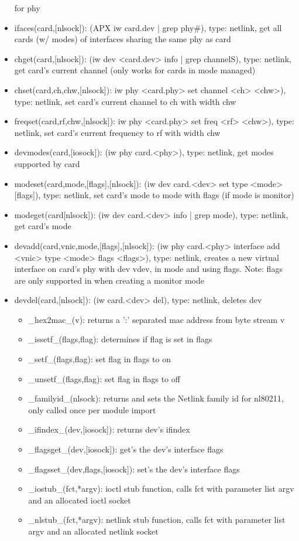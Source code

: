 \documentclass[11pt]{article}
\begin{document}
\begin{appendices}
\begin{itemize}
for phy
\item ifaces(card,[nlsock]): (APX iw card.dev | grep phy\#), type: netlink, get all
cards (w/ modes) of interfaces sharing the same phy as card
\item chget(card,[nlsock]): (iw dev <card.dev> info | grep channelS), type: 
netlink, get card's current channel (only works for cards in mode managed)
\item chset(card,ch,chw,[nlsock]): iw phy <card.phy> set channel <ch> <chw>), 
type: netlink, set card's current channel to ch with width chw
\item freqset(card,rf,chw,[nlsock]): iw phy <card.phy> set freq <rf> <chw>), 
type: netlink, set card's current frequency to rf with width chw
\item devmodes(card,[iosock]): (iw phy card.<phy>), type: netlink, get modes 
supported by card
\item modeset(card,mode,[flags],[nlsock]): (iw dev card.<dev> set type <mode> 
[flags]), type: netlink, set card's mode to mode with flags (if mode is monitor)
\item modeget(card[nlsock]): (iw dev card.<dev> info | grep mode), type: netlink,
get card's mode
\item devadd(card,vnic,mode,[flags],[nlsock]): (iw phy card.<phy> interface add
<vnic> type <mode> flags <flags>), type: netlink, creates a new virtual interface
on card's phy with dev vdev, in mode and using flags. Note: flags are only supported
in when creating a monitor mode
\item devdel(card,[nlsock]): (iw card.<dev> del), type: netlink, deletes dev
\begin{itemize}
\item \_hex2mac\_(v): returns a ':' separated mac address from byte stream v
\item \_issetf\_(flags,flag): determines if flag is set in flags
\item \_setf\_(flags,flag): set flag in flags to on
\item \_unsetf\_(flags,flag): set flag in flags to off
\item \_familyid\_(nlsock): returns and sets the Netlink family id for nl80211, 
only called once per module import
\item \_ifindex\_(dev,[iosock]): returns dev's ifindex
\item \_flagsget\_(dev,[iosock]): get's the dev's interface flags
\item \_flagsset\_(dev,flags,[iosock]): set's the dev's interface flags
\item \_iostub\_(fct,*argv): ioctl stub function, calls fct with parameter list argv
and an allocated ioctl socket
\item \_nlstub\_(fct,*argv): netlink stub function, calls fct with parameter list
argv and an allocated netlink socket
\end{itemize}
\end{itemize}


\end{appendices}
\end{document}
